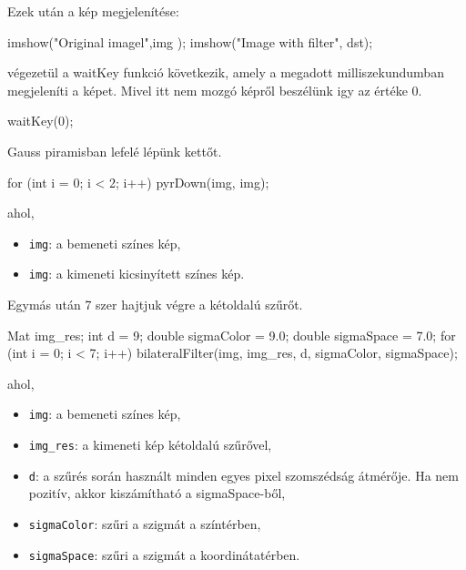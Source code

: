 Ezek után a kép megjelenítése:
\begin{cpp}
imshow("Original imagel",img );
imshow("Image with filter", dst);
\end{cpp} 
\newpage
{} végezetül a waitKey funkció következik, amely a megadott milliszekundumban megjeleníti a képet. Mivel itt nem mozgó képről beszélünk igy az értéke 0.
\begin{cpp}
waitKey(0);
\end{cpp}
Gauss piramisban lefelé lépünk kettőt.
\begin{cpp}
for (int i = 0; i < 2; i++) {
    pyrDown(img, img);
}
\end{cpp}
ahol,
\begin{itemize}
    \item \texttt{img}: a bemeneti színes kép,
    \item \texttt{img}: a kimeneti kicsinyített színes kép.
\end{itemize}

Egymás után 7 szer hajtjuk végre a kétoldalú szűrőt.
\begin{cpp}
Mat img_res;
int d = 9;
double sigmaColor = 9.0;
double sigmaSpace = 7.0;
for (int i = 0; i < 7; i++) {
    bilateralFilter(img, img_res, d, sigmaColor, sigmaSpace);
}
\end{cpp}
ahol,
\begin{itemize}
    \item \texttt{img}: a bemeneti színes kép,
    \item \texttt{img\_res}: a kimeneti kép kétoldalú szűrővel,
    \item \texttt{d}: a szűrés során használt minden egyes pixel szomszédság átmérője. Ha nem pozitív, akkor kiszámítható a sigmaSpace-ből,
    \item \texttt{sigmaColor}: szűri a szigmát a színtérben,
    \item \texttt{sigmaSpace}: szűri a szigmát a koordinátatérben.
\end{itemize}

